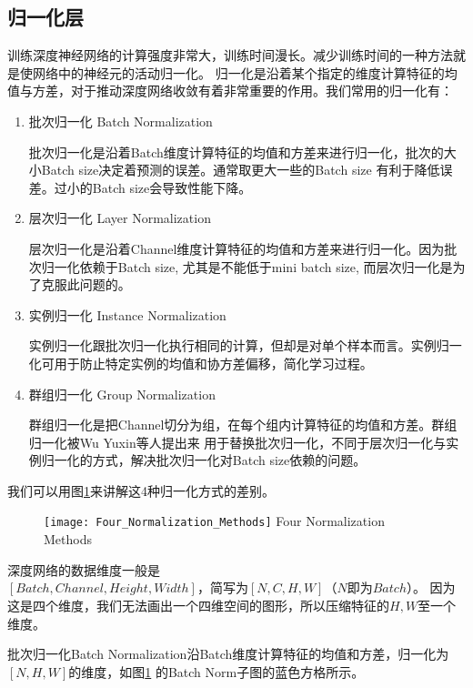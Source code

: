 \subsection{归一化层}
训练深度神经网络的计算强度非常大，训练时间漫长。减少训练时间的一种方法就是使网络中的神经元的活动归一化\cite{Ba2016LayerN}。
归一化是沿着某个指定的维度计算特征的均值与方差，对于推动深度网络收敛有着非常重要的作用。我们常用的归一化有：
\begin{enumerate}
    \item {批次归一化 Batch Normalization\cite{Ioffe2015BatchNA}}
    
    批次归一化是沿着Batch维度计算特征的均值和方差来进行归一化，批次的大小Batch size决定着预测的误差。通常取更大一些的Batch size
    有利于降低误差。过小的Batch size会导致性能下降。
    \item {层次归一化 Layer Normalization\cite{Ba2016LayerN}}
    
    层次归一化是沿着Channel维度计算特征的均值和方差来进行归一化。因为批次归一化依赖于Batch size, 尤其是不能低于mini batch size,
    而层次归一化是为了克服此问题的。
    \item {实例归一化 Instance Normalization\cite{Ulyanov2016InstanceNT}}
    
    实例归一化跟批次归一化执行相同的计算，但却是对单个样本而言。实例归一化可用于防止特定实例的均值和协方差偏移，简化学习过程。
    \item {群组归一化 Group Normalization\cite{Wu2018GroupN}}
    
    群组归一化是把Channel切分为组，在每个组内计算特征的均值和方差。群组归一化被Wu Yuxin等人\cite{Wu2018GroupN}提出来
    用于替换批次归一化，不同于层次归一化与实例归一化的方式，解决批次归一化对Batch size依赖的问题。
\end{enumerate}
我们可以用图\ref{fig:4norm}来讲解这4种归一化方式的差别。
\begin{figure}[!htp]
    \centering
    \texttt{[image: Four\_Normalization\_Methods]}
        {Four Normalization Methods}
    \label{fig:4norm}
\end{figure}
深度网络的数据维度一般是\\$[Batch, Channel, Height, Width]$，简写为$[N, C, H, W]$（$N$即为$Batch$）。
因为这是四个维度，我们无法画出一个四维空间的图形，所以压缩特征的$H, W$至一个维度。

批次归一化Batch Normalization沿Batch维度计算特征的均值和方差，归一化为$[N, H, W]$的维度，如图\ref{fig:4norm}
的Batch Norm子图的蓝色方格所示。

